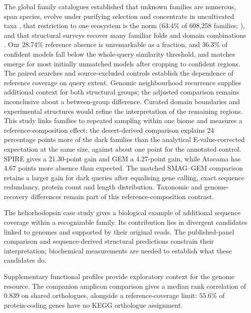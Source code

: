 \documentclass[11pt]{article}
\begin{document}
The global family catalogues established that unknown families are numerous, span species, evolve
under purifying selection and concentrate in uncultivated taxa
\citep{rodriguezdelrio2024fesnov,pavlopoulos2023darkmatter,vanni2022agnostos}, that restriction to
one ecosystem is the norm (63.4\% of 608{,}258 families; \citep{aplakidou2025quadrupling}), and
that structural surveys recover many familiar folds and domain combinations
\citep{lau2024ted,yeo2025afesm}. Our 28.74\% reference absence is unremarkable as a fraction, and
36.3\% of confident models fall below the whole-query similarity threshold, and
matches emerge for most initially unmatched models after cropping to confident regions. The paired searches and source-excluded controls establish the dependence of reference coverage on query extent. Genomic neighbourhood recurrence supplies additional context for both structural groups; the adjusted comparison remains inconclusive about a between-group difference. Curated domain boundaries and experimental structures would refine the interpretation of the remaining regions. This study links families to repeated sampling within one biome and measures a reference-composition effect: the desert-derived comparison explains 24 percentage points more of the dark families
than the analytical E-value-corrected expectation at the same size, against about one point for the annotated control. SPIRE gives a 21.30-point gain and GEM a 4.27-point gain, while Atacama has 4.67 points more absence than expected. The matched SMAG--GEM comparison retains a larger gain for dark queries after equalising gene calling, exact sequence redundancy, protein count and length distribution. Taxonomic and genome-recovery differences remain part of this reference-composition contrast.

The heliorhodopsin case study gives a biological example of additional sequence coverage within a recognizable family. Its contribution lies in divergent candidates linked to genomes and supported by their original reads. The published-panel comparison and sequence-derived structural predictions constrain their interpretation; biochemical measurements are needed to establish what these candidates do.

Supplementary functional profiles provide exploratory context for the genome resource.
The companion amplicon comparison gives a median rank correlation of 0.839 on shared
orthologues, alongside a reference-coverage limit: 55.6\% of protein-coding genes have no
KEGG orthologue assignment.
\end{document}
